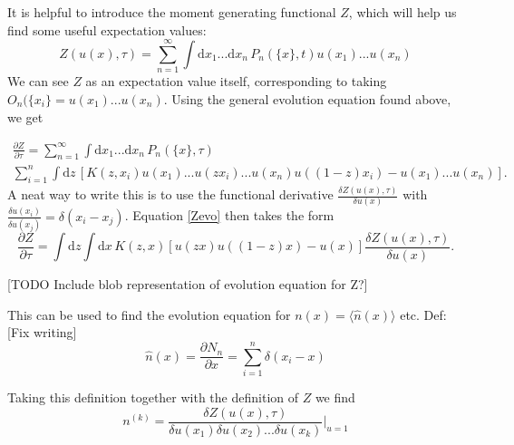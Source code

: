 \documentclass[a4paper,12pt]{article}
\newcommand{\party}[2]{\frac{\partial{#1}}{\partial{#2}}}
\numberwithin{equation}{section}
\begin{document}
It is helpful to introduce the moment generating functional $Z$, which will help us find some useful expectation values:
\begin{equation}
Z(u(x),\tau)=\sum_{n=1}^\infty \int \mathrm{d}x_1...\mathrm{d}x_n\, P_n(\{x\},t) u(x_1)...u(x_n)
\end{equation}
We can see $Z$ as an expectation value itself, corresponding to taking $O_n(\{x_i\}=u(x_1)...u(x_n)$. Using the general evolution equation found above, we get

\begin{multline}\label{Zevo}
\party{Z}{\tau}=\sum_{n=1}^\infty \int \mathrm{d}x_1...\mathrm{d}x_n\, P_n(\{x\},\tau)\\
 \sum_{i=1}^n \int \mathrm{d}z\, [ K(z,x_i)
u(x_1)...u(zx_i)...u(x_n)u((1-z)x_i) 
- u(x_1)...u(x_n) ].
\end{multline}
A neat way to write this is to use the functional derivative $\frac{\delta Z(u(x),\tau)}{\delta u(x)}$ with $\frac{\delta u(x_i)}{\delta u(x_j)}=\delta(x_i-x_j)$. Equation \eqref{Zevo} then takes the form
\begin{equation}
\party{Z}{\tau}=\int \mathrm{d}z \int \mathrm{d}x \, K(z,x) [u(zx)u((1-z)x) - u(x)]\frac{\delta Z(u(x),\tau)}{\delta u(x)}.
\end{equation}

[TODO Include blob representation of evolution equation for Z?]

This can be used to find the evolution equation for $n(x)=\langle \hat{n}(x) \rangle$ etc. Def: [Fix writing]
\begin{equation}
\hat{n}(x)=\party{N_n}{x}=\sum_{i=1}^n \delta(x_i-x)
\end{equation}

Taking this definition together with the definition of $Z$ we find
\begin{equation}\label{moments}
n^{(k)}=\frac{\delta Z(u(x),\tau)}{\delta u(x_1)\delta u(x_2)...\delta u(x_k)}\Bigg|_{u=1}
\end{equation}
\end{document}
